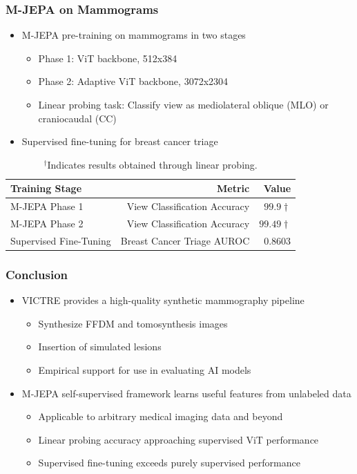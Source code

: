 \documentclass[12pt]{beamer}
\begin{document}
\begin{frame}
\frametitle{M-JEPA on Mammograms}
\begin{itemize}
    \item M-JEPA pre-training on mammograms in two stages
    \begin{itemize}
        \item Phase 1: ViT backbone, 512x384 
        \item Phase 2: Adaptive ViT backbone, 3072x2304 
        \item Linear probing task: Classify view as mediolateral oblique (MLO) or craniocaudal (CC)
    \end{itemize}
    \item Supervised fine-tuning for breast cancer triage
\end{itemize}
\begin{table}[H]
    \centering
    \small
    \begin{tabular}{l r r}
        \toprule
        Training Stage & Metric & Value \\
        \midrule
        M-JEPA Phase 1 & View Classification Accuracy & \(99.9\dagger\) \\
        M-JEPA Phase 2 & View Classification Accuracy & \(99.49\dagger\) \\
        Supervised Fine-Tuning & Breast Cancer Triage AUROC & \(0.8603\) \\
        \bottomrule
    \end{tabular}
    \normalsize
    \caption*{$^\dagger$Indicates results obtained through linear probing.}
    \label{tab:mammo-val-metrics}
\end{table}
\end{frame}


\begin{frame}
\frametitle{Conclusion}
\begin{itemize}
    \item VICTRE \supercite{victre} provides a high-quality synthetic mammography pipeline
    \begin{itemize}
        \item Synthesize FFDM and tomosynthesis images
        \item Insertion of simulated lesions
        \item Empirical support for use in evaluating AI models
    \end{itemize}
    \item M-JEPA self-supervised framework learns useful features from unlabeled data
    \begin{itemize}
        \item Applicable to arbitrary medical imaging data and beyond
        \item Linear probing accuracy approaching supervised ViT performance
        \item Supervised fine-tuning exceeds purely supervised performance
    \end{itemize}
\end{itemize}
\end{frame}
\end{document}
